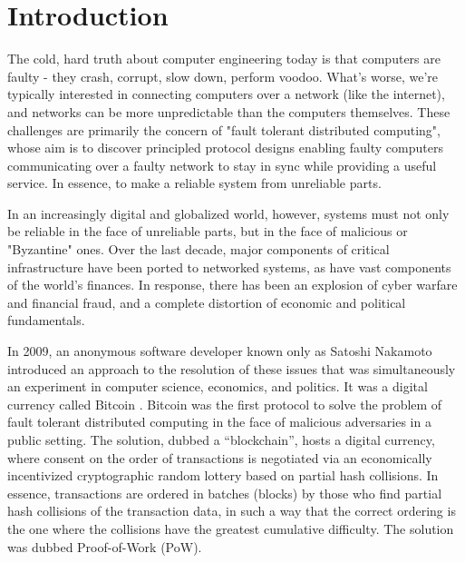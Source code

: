 \chapter{Introduction}
\label{ch:intro}

The cold, hard truth about computer engineering today is that computers are faulty - 
they crash, corrupt, slow down, perform voodoo. 
What's worse, we're typically interested in connecting computers over a network (like the internet),
and networks can be more unpredictable than the computers themselves.
These challenges are primarily the concern of "fault tolerant distributed computing",
whose aim is to discover principled protocol designs enabling faulty computers communicating over a faulty network 
to stay in sync while providing a useful service.
In essence, to make a reliable system from unreliable parts.

In an increasingly digital and globalized world, however, 
systems must not only be reliable in the face of unreliable parts, but in the face of malicious or "Byzantine" ones.
Over the last decade, major components of critical infrastructure have been ported to networked systems,
as have vast components of the world's finances.
In response, there has been an explosion of cyber warfare and financial fraud,
and a complete distortion of economic and political fundamentals.

In 2009, an anonymous software developer known only as Satoshi Nakamoto introduced an approach to the resolution of these issues 
that was simultaneously an experiment in computer science, economics, and politics. 
It was a digital currency called Bitcoin \cite{bitcoin}.
Bitcoin was the first protocol to solve the problem of fault tolerant distributed computing in the face of malicious adversaries in a public setting.
The solution, dubbed a ``blockchain'', hosts a digital currency, 
where consent on the order of transactions is negotiated via an economically incentivized cryptographic random lottery based on partial hash collisions.
In essence, transactions are ordered in batches (blocks) by those who find partial hash collisions of the transaction data, 
in such a way that the correct ordering is the one where the collisions have the greatest cumulative difficulty.
The solution was dubbed Proof-of-Work (PoW).

